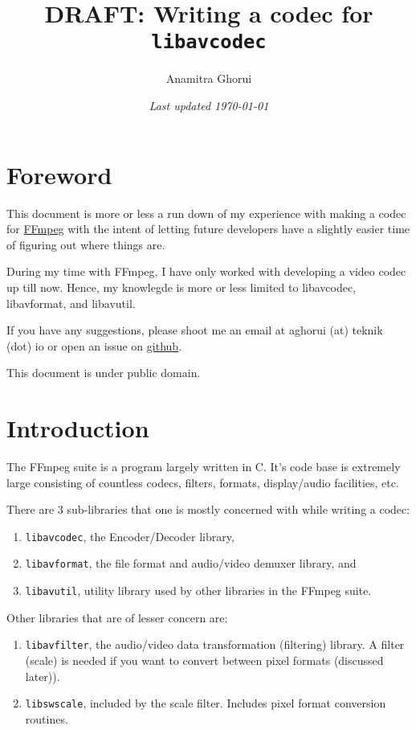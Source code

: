 \documentclass{article}
\begin{document}
\title{DRAFT: Writing a codec for \texttt{libavcodec}}
\author{Anamitra Ghorui}
\date{\emph{Last updated \today}}
\maketitle

\tableofcontents

\section{Foreword}

This document is more or less a run down of my experience with making a codec 
for \href{https://ffmpeg.org}{FFmpeg} with the intent of letting future
developers have a slightly easier time of figuring out where things are.

During my time with FFmpeg, I have only worked with developing a video codec up till now. Hence, my knowlegde is more or less limited to libavcodec, libavformat, and libavutil.

If you have any suggestions, please shoot me an email at aghorui (at) teknik (dot) io or open an issue on \href{https://github.com/daujerrine/ffmpeg-doc}{github}.

This document is under public domain.

\section{Introduction}

The FFmpeg suite is a program largely written in C. It's code base is extremely large consisting of countless codecs, filters, formats, display/audio facilities, etc.

There are 3 sub-libraries that one is mostly concerned with while writing a codec:

\begin{enumerate}
\item \texttt{libavcodec}, the Encoder/Decoder library,
\item \texttt{libavformat}, the file format and audio/video demuxer library, and
\item \texttt{libavutil}, utility library used by other libraries in the FFmpeg suite.
\end{enumerate}

Other libraries that are of lesser concern are:

\begin{enumerate}
\item \texttt{libavfilter}, the audio/video data transformation (filtering) library. A filter (scale) is needed if you want to convert between pixel formats (discussed later)).
\item \texttt{libswscale}, included by the scale filter. Includes pixel format conversion routines.
\end{enumerate}
\end{document}
